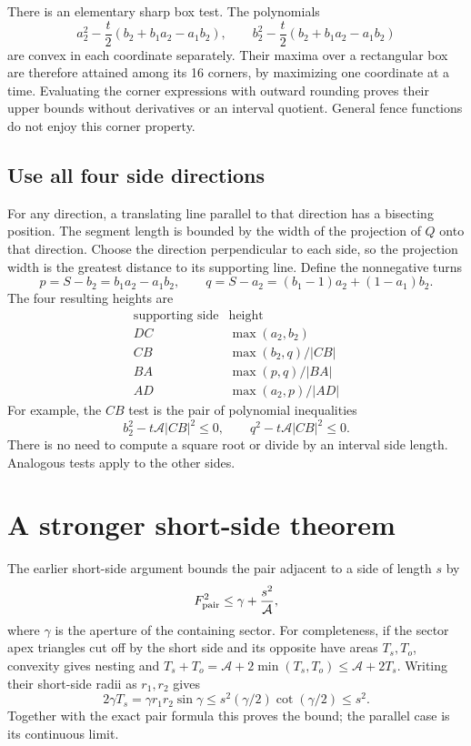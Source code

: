 \documentclass[11pt]{article}
\newcommand{\Area}{\mathcal A}
\begin{document}
There is an elementary sharp box test. The polynomials
\[
 a_2^2-\frac t2(b_2+b_1a_2-a_1b_2),\qquad
 b_2^2-\frac t2(b_2+b_1a_2-a_1b_2)
\]
are convex in each coordinate separately. Their maxima over a rectangular box
are therefore attained among its 16 corners, by maximizing one coordinate
at a time. Evaluating the corner expressions with outward rounding proves
their upper bounds without derivatives or an interval quotient.
General fence functions do not enjoy this corner property.

\subsection{Use all four side directions}
For any direction, a translating line parallel to that direction has a
bisecting position. The segment length is bounded by the width of the
projection of \(Q\) onto that direction. Choose the direction perpendicular
to each side, so the projection width is the greatest distance to its
supporting line. Define the nonnegative turns
\[
 p=S-b_2=b_1a_2-a_1b_2,\qquad
 q=S-a_2=(b_1-1)a_2+(1-a_1)b_2.
\]
The four resulting heights are
\[
\begin{array}{c|c}
\text{supporting side}&\text{height}\\ \hline
DC&\max(a_2,b_2)\\
CB&\max(b_2,q)/|CB|\\
BA&\max(p,q)/|BA|\\
AD&\max(a_2,p)/|AD|
\end{array}
\]
For example, the \(CB\) test is the pair of polynomial inequalities
\[
 b_2^2-t\Area|CB|^2\le0,\qquad q^2-t\Area|CB|^2\le0.
\]
There is no need to compute a square root or divide by an interval side
length. Analogous tests apply to the other sides.

\section{A stronger short-side theorem}
The earlier short-side argument bounds the pair adjacent to a side of
length \(s\) by
\[
 F_{\rm pair}^2\le\gamma+\frac{s^2}{\Area},
\]
where \(\gamma\) is the aperture of the containing sector.
For completeness, if the sector apex triangles cut off by the short side
and its opposite have areas \(T_s,T_o\), convexity gives nesting and
\(T_s+T_o=\Area+2\min(T_s,T_o)\le\Area+2T_s\).
Writing their short-side radii as \(r_1,r_2\) gives
\[
 2\gamma T_s=\gamma r_1r_2\sin\gamma
 \le s^2(\gamma/2)\cot(\gamma/2)\le s^2.
\]
Together with the exact pair formula this proves the bound; the parallel
case is its continuous limit.
\end{document}
